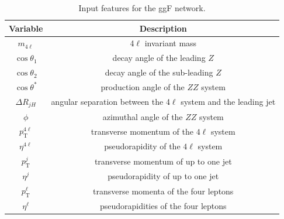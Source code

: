 \begin{table}[htbp]
        \centering
        \caption{Input features for the ggF network.}
        \label{tab:dnn_features_ggf}
        \begin{tabular}{c | c}
                \toprule
                Variable & Description \\
                \midrule
                $m_{4\ell}$ & 4$\ell$ invariant mass \\
                $\cos\theta_1$ & decay angle of the leading $Z$ \\
                $\cos\theta_2$ & decay angle of the sub-leading $Z$ \\
                $\cos\theta^*$ & production angle of the $ZZ$ system \\
                $\Delta R _{jH}$ & angular separation between the 4$\ell$ system and the leading jet\\
                $\phi$ & azimuthal angle of the $ZZ$ system \\
                $p_\mathrm{T}^{4\ell}$ & transverse momentum of the $4\ell$ system \\
                $\eta^{4\ell}$ & pseudorapidity of the $4\ell$ system \\
                $p_\mathrm{T}^j$ & transverse momentum of up to one jet \\
                $\eta^j$ & pseudorapidity of up to one jet \\
                $p_\mathrm{T}^\ell$ & transverse momenta of the four leptons \\
                $\eta^\ell$ & pseudorapidities of the four leptons  \\
                \bottomrule
        \end{tabular}
\end{table}

